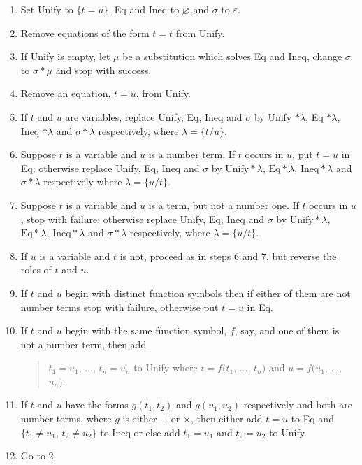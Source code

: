 \documentclass[letterpaper]{report}
\begin{document}
\begin{enumerate}
	\def\labelenumi{(\arabic{enumi})}
	\item
	Set Unify to $\{t = u\}$, Eq and Ineq to $\varnothing$ and
	$\sigma$ to $\varepsilon$.
	\item
	Remove equations of the form $t = t$ from Unify.
	\item
	If Unify is empty, let $\mu$ be a substitution which solves Eq and
	Ineq, change $\sigma$ to $\sigma\ast\mu$ and stop with success.
	\item
	Remove an equation, $t = u$, from Unify.
	\item
	If $t$ and $u$ are variables, replace Unify, Eq, Ineq and
	$\sigma$ by Unify $\ast\lambda$, Eq $\ast\lambda$, Ineq $\ast\lambda$
	and $\sigma\ast\lambda$ respectively, where $\lambda = \{t/u\}$.
	\item
	Suppose $t$ is a variable and $u$ is a number term. If $t$
	occurs in $u$, put $t = u$ in Eq; otherwise replace Unify, Eq,
	Ineq and $\sigma$ by $\mathrm{Unify}\ast\lambda$, $\mathrm{Eq}\ast\lambda$, $\mathrm{Ineq}\ast\lambda$ and $\sigma\ast\lambda$ respectively where
	$\lambda = \{u/t\}$.
	\item
	Suppose $t$ is a variable and $u$ is a term, but not a number one.
	If $t$ occurs in $u$, stop with failure; otherwise replace Unify,
	Eq, Ineq and $\sigma$ by $\mathrm{Unify}\ast\lambda$, $\mathrm{Eq}\ast\lambda$, $\mathrm{Ineq}\ast\lambda$ and $\sigma\ast\lambda$ respectively, where
	$\lambda = \{u/t\}$.
	\item
	If $u$ is a variable and $t$ is not, proceed as in steps 6 and 7,
	but reverse the roles of $t$ and $u$.
	\item
	If $t$ and $u$ begin with distinct function symbols then if either
	of them are not number terms stop with failure, otherwise put
	$t = u$ in Eq.
	\item
	If $t$ and $u$ begin with the same function symbol, $f$, say,
	and one of them is not a number term, then add
	\begin{quote}
	$t_{1} = u_{1}$,
	$\ldots$, $t_{n} = u_{n}$ to Unify where $t = f(t_{1}$,
	$\ldots$, $t_{n})$ and $u = f(u_{1}$, $\ldots$, $u_{n})$.
	\end{quote}
	\item
	If $t$ and $u$ have the forms $g\left(t_{1},t_{2}\right)$ and
	$g\left(u_{1},u_{2}\right)$ respectively and both are number terms,
	where $g$ is either $+$ or $\times$, then either add $t = u$
	to Eq and $\{t_{1} \neq u_{1},\,t_{2} \neq u_{2}\}$ to Ineq or else
	add $t_{1} = u_{1}$ and $t_{2} = u_{2}$ to Unify.
	\item
	Go to 2.
\end{enumerate}
\end{document}
